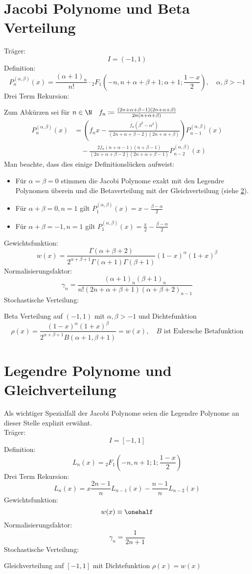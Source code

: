 \section{Jacobi Polynome und Beta Verteilung}
Träger:
\[I=(-1,1)\]
Definition:
\[P_n^{(\alpha, \beta)}(x)=\frac{(\alpha + 1)_n}{n!}\cdot {_2F_1}\left(-n,n+\alpha+\beta+1;\alpha+1;\frac{1-x}{2}\right),\quad \alpha,\beta>-1\]
Drei Term Rekursion:
\begin{center}
Zum Abkürzen sei für $n\in\N\quad f_n \coloneqq \frac{(2n + \alpha + \beta - 1)(2n + \alpha + \beta)}{2n(n + \alpha + \beta)}$
\begin{align*}
P_n^{(\alpha, \beta)}(x)&=\left(f_nx-\frac{f_n(\beta^2-\alpha^2)}{(2n + \alpha + \beta - 2)(2n + \alpha +\beta)}\right)P_{n-1}^{(\alpha, \beta)}(x)\\
&\quad-\frac{2f_n(n + \alpha - 1)(n + \beta - 1)}{(2n + \alpha + \beta - 2)(2n + \alpha + \beta - 1)}P_{n-2}^{(\alpha, \beta)}(x)
\end{align*}
Man beachte, dass dies einige Definitionslücken aufweist:
\begin{itemize}
\item Für $\alpha=\beta=0$ stimmen die Jacobi Polynome exakt mit den Legendre Polynomen überein und die Betaverteilung mit der Gleichverteilung (siehe \ref{seclegendre}).
\item Für $\alpha+\beta=0,n=1$ gilt $P_1^{(\alpha,\beta)}(x)=x-\frac{\beta-\alpha}{2}$
\item Für $\alpha+\beta=-1,n=1$ gilt $P_1^{(\alpha,\beta)}(x)=\frac{x}{2}-\frac{\beta-\alpha}{2}$
\end{itemize}
\end{center}
Gewichtsfunktion:
\[w(x)=\frac{\Gamma(\alpha+\beta+2)}{2^{\alpha+\beta+1}\Gamma(\alpha+1)\Gamma(\beta+1)}(1-x)^\alpha(1+x)^\beta\]
Normalisierungsfaktor:
\[\gamma_n=\frac{(\alpha+1)_n(\beta+1)_n}{n!(2n+\alpha+\beta+1)(\alpha+\beta+2)_{n-1}}\]
Stochastische Verteilung:
\begin{center}
Beta Verteilung auf $(-1,1)$ mit $\alpha,\beta>-1$ und Dichtefunktion
\[\rho(x)=\frac{(1 - x)^\alpha(1 + x)^\beta}{2^{\alpha + \beta + 1}B(\alpha+1,\beta+1)}=w(x),\quad B\text{ ist Eulersche Betafunktion}\]
\end{center}

\section{Legendre Polynome und Gleichverteilung}
\label{seclegendre}
Als wichtiger Spezialfall der Jacobi Polynome seien die Legendre Polynome an dieser Stelle explizit erwähnt.\\
Träger:
\[I=[-1,1]\]
Definition:
\[L_n(x)={_2F_1}\left(-n,n+1;1;\frac{1-x}{2}\right)\]
Drei Term Rekursion:
\[L_{n}(x)=x\frac{2n-1}{n}L_{n-1}(x)-\frac{n-1}{n}L_{n-2}(x)\]
Gewichtsfunktion:
\[w(x)\equiv \onehalf\]
Normalisierungsfaktor:
\[\gamma_n=\frac{1}{2n+1}\]
Stochastische Verteilung:
\begin{center}
Gleichverteilung auf $[-1,1]$ mit Dichtefunktion $\rho(x)=w(x)$
\end{center}
